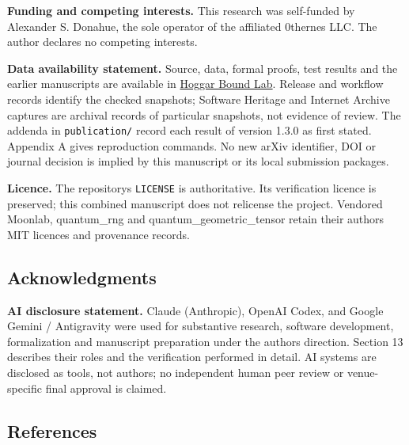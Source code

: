 \documentclass[11pt,a4paper]{article}
\begin{document}
\textbf{Funding and competing interests.} This research was self-funded by Alexander S. Donahue, the sole
operator of the affiliated 0thernes LLC. The author declares no competing interests.

\textbf{Data availability statement.} Source, data, formal proofs, test results and the earlier manuscripts
are available in \href{https://github.com/0thernes/hoggar-bound-lab}{Hoggar Bound Lab}. Release and workflow
records identify the checked snapshots; Software Heritage and Internet Archive captures are archival
records of particular snapshots, not evidence of review. The addenda in \texttt{publication/} record each
result of version 1.3.0 as first stated.
Appendix A gives reproduction commands. No new arXiv identifier, DOI or journal decision is implied
by this manuscript or its local submission packages.

\textbf{Licence.} The repository\textquotesingle s \texttt{LICENSE} is authoritative. Its verification licence is preserved;
this combined manuscript does not relicense the project. Vendored Moonlab, quantum\_rng and
quantum\_geometric\_tensor retain their authors\textquotesingle{} MIT licences and provenance records.

\subsection{Acknowledgments}\label{acknowledgments}

\textbf{AI disclosure statement.} Claude (Anthropic), OpenAI Codex, and Google Gemini / Antigravity were
used for substantive research, software development, formalization and manuscript preparation under
the author\textquotesingle s direction. Section 13 describes their roles and the verification performed in detail. AI
systems are disclosed as tools, not authors; no independent human peer review or venue-specific final
approval is claimed.

\subsection{References}\label{references}
\end{document}
